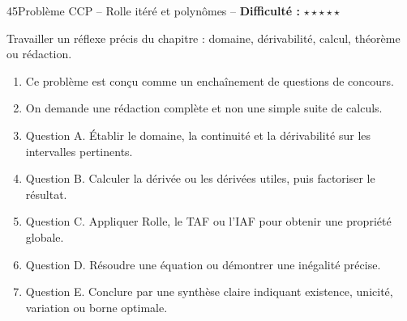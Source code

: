 \documentclass[11pt,a4paper]{article}
\newcommand{\etoiles}[1]{\textbf{Difficulté :} #1}
\begin{document}
\begin{exobox}{45}{Problème CCP -- Rolle itéré et polynômes -- \etoiles{$\star\star\star\star\star$}}

\begin{objectifbox}
Travailler un réflexe précis du chapitre : domaine, dérivabilité, calcul, théorème ou rédaction.
\end{objectifbox}

\begin{enumerate}

\item Ce problème est conçu comme un enchaînement de questions de concours.

\item On demande une rédaction complète et non une simple suite de calculs.

\item Question A. Établir le domaine, la continuité et la dérivabilité sur les intervalles pertinents.

\item Question B. Calculer la dérivée ou les dérivées utiles, puis factoriser le résultat.

\item Question C. Appliquer Rolle, le TAF ou l'IAF pour obtenir une propriété globale.

\item Question D. Résoudre une équation ou démontrer une inégalité précise.

\item Question E. Conclure par une synthèse claire indiquant existence, unicité, variation ou borne optimale.

\end{enumerate}

\end{exobox}
\end{document}
